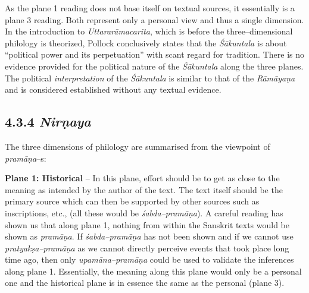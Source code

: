 As the plane 1 reading does not base itself on textual sources, it essentially is a plane 3 reading. Both represent only a personal view and thus a single dimension. In the introduction to \textit{Uttararāmacarita}, which is before the three–dimensional philology is theorized, Pollock conclusively states that the \textit{Śākuntala }is about “political power and its perpetuation” with scant regard for tradition. There is no evidence provided for the political nature of the \textit{Śākuntala} along the three planes. The political \textit{interpretation} of the \textit{Śākuntala }is similar to that of the \textit{Rāmāyaṇa} and is considered established without any textual evidence.

\vspace{-.3cm}

\subsection*{4.3.4 {\it {\bfseries Nirṇaya}}}

The three dimensions of philology are summarised from the viewpoint of \textit{pramāṇa}–s:

\textbf{Plane 1: Historical} – In this plane, effort should be to get as close to the meaning as intended by the author of the text. The text itself should be the primary source which can then be supported by other sources such as inscriptions, etc., (all these would be \textit{śabda–pramāṇa}). A careful reading has shown us that along plane 1, nothing from within the Sanskrit texts would be shown as \textit{pramāṇa}. If \textit{śabda–pramāṇa} has not been shown and if we cannot use \textit{pratyakṣa–pramāṇa} as we cannot directly perceive events that took place long time ago, then only \textit{upamāna–pramāṇa} could be used to validate the inferences along plane 1. Essentially, the meaning along this plane would only be a personal one and the historical plane is in essence the same as the personal (plane 3).

